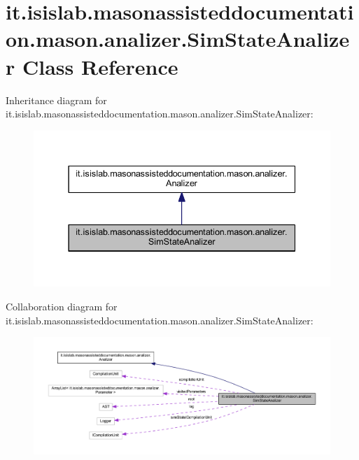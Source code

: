 \hypertarget{classit_1_1isislab_1_1masonassisteddocumentation_1_1mason_1_1analizer_1_1_sim_state_analizer}{\section{it.\-isislab.\-masonassisteddocumentation.\-mason.\-analizer.\-Sim\-State\-Analizer Class Reference}
\label{classit_1_1isislab_1_1masonassisteddocumentation_1_1mason_1_1analizer_1_1_sim_state_analizer}
}


Inheritance diagram for it.\-isislab.\-masonassisteddocumentation.\-mason.\-analizer.\-Sim\-State\-Analizer\-:\nopagebreak
\begin{figure}[H]
\begin{center}
\leavevmode
\includegraphics[width=337pt]{classit_1_1isislab_1_1masonassisteddocumentation_1_1mason_1_1analizer_1_1_sim_state_analizer__inherit__graph}
\end{center}
\end{figure}


Collaboration diagram for it.\-isislab.\-masonassisteddocumentation.\-mason.\-analizer.\-Sim\-State\-Analizer\-:\nopagebreak
\begin{figure}[H]
\begin{center}
\leavevmode
\includegraphics[width=350pt]{classit_1_1isislab_1_1masonassisteddocumentation_1_1mason_1_1analizer_1_1_sim_state_analizer__coll__graph}
\end{center}
\end{figure}
